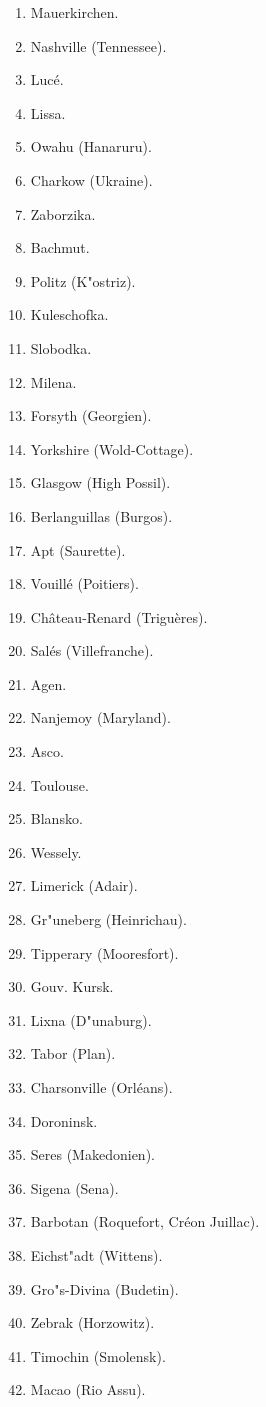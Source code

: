 \documentclass[a4paper, 11pt, oneside, polutonikogreek, german]{article}
\begin{document}
\begin{enumerate}
    \item Mauerkirchen.
    \item Nashville (Tennessee).
    \item Lucé.
    \item Lissa.
    \item Owahu (Hanaruru).
    \item Charkow (Ukraine).
    \item Zaborzika.
    \item Bachmut.
    \item Politz (K"ostriz).
    \item Kuleschofka.
    \item Slobodka.
    \item Milena.
    \item Forsyth (Georgien).
    \item Yorkshire (Wold-Cottage).
    \item Glasgow (High Possil).
    \item Berlanguillas (Burgos).
    \item Apt (Saurette).
    \item Vouillé (Poitiers).
    \item Château-Renard (Triguères).
    \item Salés (Villefranche).
    \item Agen.
    \item Nanjemoy (Maryland).
    \item Asco.
    \item Toulouse.
    \item Blansko.
    \item Wessely.
    \item Limerick (Adair).
    \item Gr"uneberg (Heinrichau).
    \item Tipperary (Mooresfort).
    \item Gouv. Kursk.
    \item Lixna (D"unaburg).
    \item Tabor (Plan).
    \item Charsonville (Orléans).
    \item Doroninsk.
    \item Seres (Makedonien).
    \item Sigena (Sena).
    \item Barbotan (Roquefort, Créon Juillac).
    \item Eichst"adt (Wittens).
    \item Gro"s-Divina (Budetin).
    \item Zebrak (Horzowitz).
    \item Timochin (Smolensk).
    \item Macao (Rio Assu).
\end{enumerate}
\end{document}
